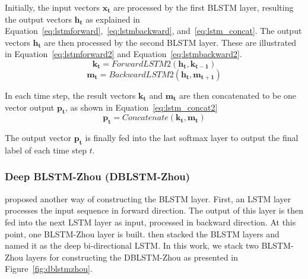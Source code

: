Initially, the input vectors $\mathbf{x_{t}}$ are processed by the first BLSTM layer, resulting the output vectors $\mathbf{h_{t}}$ as explained in Equation~\ref{eq:lstmforward},~\ref{eq:lstmbackward}, and~\ref{eq:lstm_concat}. The output vectors $\mathbf{h_{t}}$ are then processed by the second BLSTM layer. These are illustrated in Equation~\ref{eq:lstmforward2} and Equation~\ref{eq:lstmbackward2}.
\begin{equation}
\label{eq:lstmforward2}
\mathbf{k_{t}} = ForwardLSTM2(\mathbf{h_{t}}, \mathbf{k_{t-1}})
\end{equation}
\begin{equation}
\label{eq:lstmbackward2}
\mathbf{m_{t}} = BackwardLSTM2(\mathbf{h_{t}}, \mathbf{m_{t+1}})
\end{equation}

In each time step, the result vectors $\mathbf{k_{t}}$ and $\mathbf{m_{t}}$ are then concatenated to be one vector output $\mathbf{p_{t}}$, as shown in Equation~\ref{eq:lstm_concat2}
\begin{equation}
\label{eq:lstm_concat2}
\mathbf{p_{t}} = Concatenate(\mathbf{k_{t}}, \mathbf{m_{t}})
\end{equation}

The output vector $\mathbf{p_{t}}$ is finally fed into the last softmax layer to output the final label of each time step $t$.

\subsubsection{Deep BLSTM-Zhou (DBLSTM-Zhou)}
\cite{zhou2015end} proposed another way of constructing the BLSTM layer. First, an LSTM layer processes the input sequence in forward direction. The output of this layer is then fed into the next LSTM layer as input, processed in backward direction. At this point, one BLSTM-Zhou layer is built. \cite{zhou2015end} then stacked the BLSTM layers and named it as the deep bi-directional LSTM. In this work, we stack two BLSTM-Zhou layers for constructing the DBLSTM-Zhou as presented in Figure~\ref{fig:dblstmzhou}.

